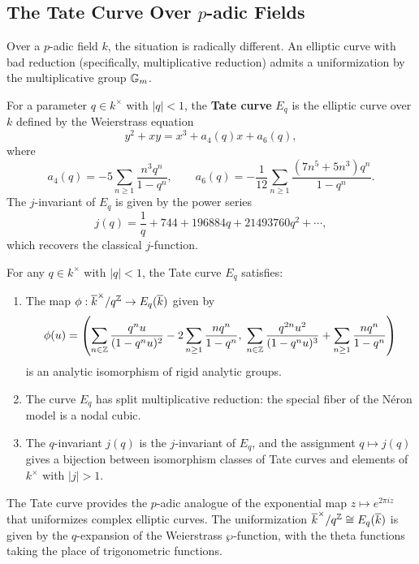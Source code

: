 \subsection{The Tate Curve Over \texorpdfstring{\(p\)}{p}-adic Fields}

Over a \(p\)-adic field \(k\), the situation is radically different. An elliptic curve with bad reduction (specifically, multiplicative reduction) admits a uniformization by the multiplicative group \(\mathbb{G}_m\).

\begin{definition}
For a parameter \(q \in k^\times\) with \(|q| < 1\), the \textbf{Tate curve} \(E_q\) is the elliptic curve over \(k\) defined by the Weierstrass equation
\[
y^2 + xy = x^3 + a_4(q) x + a_6(q),
\]
where
\[
a_4(q) = -5 \sum_{n \geq 1} \frac{n^3 q^n}{1-q^n}, \qquad
a_6(q) = -\frac{1}{12} \sum_{n \geq 1} \frac{(7n^5 + 5n^3)q^n}{1-q^n}.
\]
The \(j\)-invariant of \(E_q\) is given by the power series
\[
j(q) = \frac{1}{q} + 744 + 196884 q + 21493760 q^2 + \cdots,
\]
which recovers the classical \(j\)-function.
\end{definition}

\begin{theorem}[Tate, 1960s]
For any \(q \in k^\times\) with \(|q| < 1\), the Tate curve \(E_q\) satisfies:
\begin{enumerate}
    \item The map \(\phi: \overline{k}^\times / q^{\mathbb{Z}} \to E_q(\overline{k})\) given by
    \[
    \phi(u) = \left( \sum_{n \in \mathbb{Z}} \frac{q^n u}{(1-q^n u)^2} - 2 \sum_{n \geq 1} \frac{n q^n}{1-q^n}, \;
    \sum_{n \in \mathbb{Z}} \frac{q^{2n} u^2}{(1 - q^n u)^3} + \sum_{n \geq 1} \frac{n q^n}{1-q^n} \right)
    \]
    is an analytic isomorphism of rigid analytic groups.
    \item The curve \(E_q\) has split multiplicative reduction: the special fiber of the N\'eron model is a nodal cubic.
    \item The \(q\)-invariant \(j(q)\) is the \(j\)-invariant of \(E_q\), and the assignment \(q \mapsto j(q)\) gives a bijection between isomorphism classes of Tate curves and elements of \(k^\times\) with \(|j| > 1\).
\end{enumerate}
\end{theorem}

The Tate curve provides the \(p\)-adic analogue of the exponential map \(z \mapsto e^{2\pi i z}\) that uniformizes complex elliptic curves. The uniformization \(\overline{k}^\times / q^{\mathbb{Z}} \cong E_q(\overline{k})\) is given by the \(q\)-expansion of the Weierstrass \(\wp\)-function, with the theta functions taking the place of trigonometric functions.

